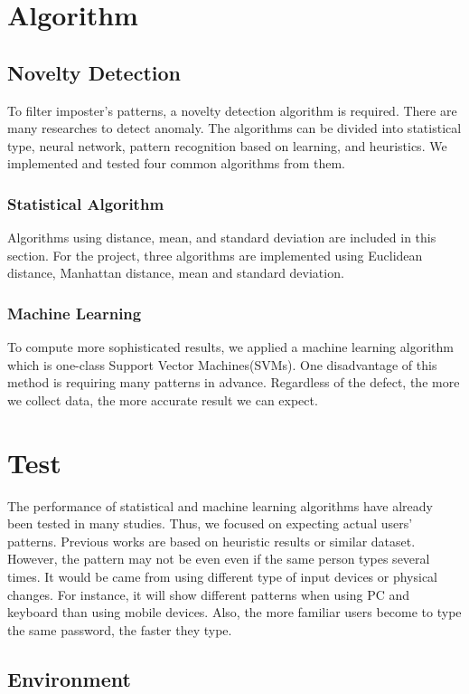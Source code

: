 \documentclass[twocolumn,showpacs,%
  nofootinbib,aps,%
  eqsecnum,prd,notitlepage,showkeys,10pt]{revtex4-1}
\begin{document}
\section{Algorithm}
\subsection{Novelty Detection}
To filter imposter's patterns, a novelty detection algorithm is required. There are many researches to detect anomaly. The algorithms can be divided into statistical type, neural network, pattern recognition based on learning, and heuristics\cite{banerjee2012biometric}. We implemented and tested four common algorithms from them.
\subsubsection{Statistical Algorithm}
Algorithms using distance, mean, and standard deviation are included in this section. For the project, three algorithms are implemented using Euclidean distance, Manhattan distance, mean and standard deviation.\par

\subsubsection{Machine Learning}
To compute more sophisticated results, we applied a machine learning algorithm which is one-class Support Vector Machines(SVMs). One disadvantage of this method is requiring many patterns in advance. Regardless of the defect, the more we collect data, the more accurate result we can expect.


\section{Test}
The performance of statistical and machine learning algorithms have already been tested in many studies. Thus, we focused on expecting actual users' patterns. Previous works are based on heuristic results or similar dataset. However, the pattern may not be even even if the same person types several times. It would be came from using different type of input devices or physical changes. For instance, it will show different patterns when using PC and keyboard than using mobile devices. Also, the more familiar users become to type the same password, the faster they type.

\subsection{Environment}
\end{document}
